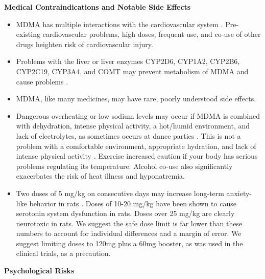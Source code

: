 \documentclass[12pt,letterpaper]{article}
\begin{document}
\noindent \textbf{Medical Contraindications and Notable Side Effects}
\begin{itemize}
    \item MDMA has multiple interactions with the cardiovascular system \cite{bonsignoreCardio}. Pre-existing cardiovascular problems, high doses, frequent use, and co-use of other drugs heighten risk of cardiovascular injury. 
    \item Problems with the liver or liver enzymes CYP2D6, CYP1A2, CYP2B6, CYP2C19, CYP3A4, and COMT may prevent metabolism of MDMA and cause problems \cite{torreEnzymes}.
    \item MDMA, like many medicines, may have rare, poorly understood side effects. 
    \item Dangerous overheating or low sodium levels may occur if MDMA is combined with dehydration, intense physical activity, a hot/humid environment, and lack of electrolytes, as sometimes occurs at dance parties \cite{vanOverheatingAlcohol}. This is not a problem with a comfortable environment, appropriate hydration, and lack of intense physical activity \cite{mitchellMDMAClinicalTrial}. Exercise increased caution if your body has serious problems regulating its temperature. Alcohol co-use also significantly exacerbates the risk of heat illness and hyponatremia.
    \item Two doses of 5 mg/kg on consecutive days may increase long-term anxiety-like behavior in rats \cite{baumannRats}. Doses of 10-20 mg/kg have been shown to cause serotonin system dysfunction in rats. Doses over 25 mg/kg are clearly neurotoxic in rats. We suggest the safe dose limit is far lower than these numbers to account for individual differences and a margin of error. We suggest limiting doses to 120mg plus a 60mg booster, as was used in the clinical trials, as a precaution. 
\end{itemize}
\noindent \textbf{Psychological Risks}
\end{document}

